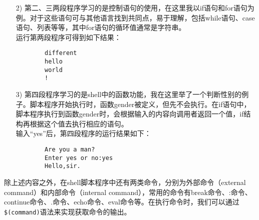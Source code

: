 \documentclass{ctexart}
\begin{document}
\begin{itemize}
	\item [2)]
	 第二、三两段程序学习的是控制语句的使用，在这里我以if语句和for语句为例。对于这些语句可与其他语言找到共同点，易于理解，包括while语句、case语句、列表等等，其中for语句的循环值通常是字符串。\\
	 运行第两段程序可得到如下结果：
	 \begin{verbatim}
	 	different
	 	hello
	 	world
	 	!
	 \end{verbatim}
	\item [3)]
	第四段程序学习的是shell中的函数功能，我在这里举了一个判断性别的例子。脚本程序开始执行时，函数gender被定义，但先不会执行。在if语句中，脚本程序执行到函数gender时，会根据输入的内容向调用者返回一个值，if结构再根据这个值去执行相应的语句。\\
	输入“yes”后，第四段程序的运行结果如下：
	\begin{verbatim}
		Are you a man?
		Enter yes or no:yes
		Hello,sir.
	\end{verbatim}
\end{itemize}

除上述内容之外，在shell脚本程序中还有两类命令，分别为外部命令（external command）和内部命令（internal command），常用的命令有break命令、:命令、continue命令、.命令、echo命令、eval命令等。在执行命令时，我们可以通过\verb|$(command)|语法来实现获取命令的输出。
\end{document}
